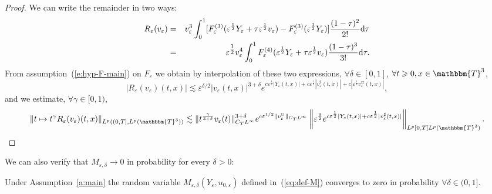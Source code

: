 \begin{proof}
  We can write the remainder in two ways:
  \begin{eqnarray*}
    R_{\varepsilon} (v_{\varepsilon}) & = & v_{\varepsilon}^3 \int_0^1
    [F_{\varepsilon}^{(3)} (\varepsilon^{\frac{1}{2}} Y_{\varepsilon} + \tau
    \varepsilon^{\frac{1}{2}} v_{\varepsilon}) - F_{\varepsilon}^{(3)}
    (\varepsilon^{\frac{1}{2}} Y_{\varepsilon})]  \frac{(1 - \tau)^2}{2!}
    \mathrm{d} \tau\\
    & = & \varepsilon^{\tfrac{1}{2}} v_{\varepsilon}^4 \int_0^1
    F_{\varepsilon}^{(4)} (\varepsilon^{\frac{1}{2}} Y_{\varepsilon} + \tau
    \varepsilon^{\frac{1}{2}} v_{\varepsilon})  \frac{(1 - \tau)^3}{3!} \mathrm{d}
    \tau .
  \end{eqnarray*}
  From assumption~(\ref{e:hyp-F-main}) on $F_{\varepsilon}$ we obtain by
  interpolation of these two expressions, $\forall \delta \in [0, 1]$,
  $\forall t \geqslant 0, x \in \mathbbm{T}^3$,
  \[ | R_{\varepsilon} (v_{\varepsilon}) (t, x) | \lesssim \varepsilon^{\delta
     / 2} | v_{\varepsilon} (t, x) |^{3 + \delta} e^{c
     \varepsilon^{\frac{1}{2}}  | Y_{\varepsilon} (t, x) | + c
     \varepsilon^{\frac{1}{2}} | v^{\sharp}_{\varepsilon} (t, x) | + c |
     \varepsilon^{\frac{1}{2}} v^{\Box}_{\varepsilon} (t, x) |}, \]
  and we estimate, $\forall \gamma \in [0, 1)$,
  \[ \| t \mapsto t^{\gamma} R_{\varepsilon} (v_{\varepsilon}) (t, x) \|_{L^p
     ((0, T], L^p (\mathbbm{T}^3))} \lesssim \|t^{\frac{\gamma}{3 + \delta}}
     v_{\varepsilon} (t) \|_{C_T L^{\infty}}^{3 + \delta} e^{c \varepsilon^{1
     / 2} \|v^{\Box}_{\varepsilon} \|_{C_T L^{\infty}}} \left\|
     \varepsilon^{\frac{\delta}{2}} e^{c \varepsilon^{\frac{1}{2}}  |
     Y_{\varepsilon} (t, x) | + c \varepsilon^{\frac{1}{2}} |
     v^{\sharp}_{\varepsilon} (t, x) |} \right\|_{L^p [0, T] L^p
     (\mathbbm{T}^3)} . \]
\end{proof}

We can also verify that $M_{\varepsilon, \delta} \rightarrow 0$ in probability
for every $\delta > 0$:

\begin{lemma}
  \label{l:rem-converg}Under Assumption~\ref{a:main} the random variable
  $M_{\varepsilon, \delta} (Y_{\varepsilon}, u_{0, \varepsilon})$ defined
  in~(\ref{eq:def-M}) converges to zero in probability $\forall \delta \in (0,
  1]$. 
\end{lemma}

